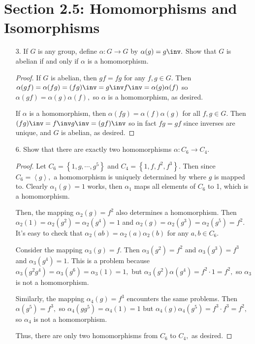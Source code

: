 \documentclass{article}
\begin{document}
\section*{Section 2.5: Homomorphisms and Isomorphisms}
\begin{itemize}
	\item[3.] If $G$ is any group, define $\alpha:G\to G$ by $\alpha(g)=g\inv.$ Show that $G$ is abelian if and only if $\alpha$ is a homomorphism.
		\begin{proof}
			If $G$ is abelian, then $gf=fg$ for any $f, g\in G.$ Then $\alpha(gf)=\alpha(fg)=(fg)\inv=g\inv f\inv = \alpha(g) \alpha(f)$ so $\alpha(gf)=\alpha(g)\alpha(f),$ so $\alpha$ is a homomorphism, as desired.

			If $\alpha$ is a homomorphism, then $\alpha(fg)=\alpha(f)\alpha(g)$ for all $f, g\in G.$ Then $(fg)\inv=f\inv g\inv = (gf)\inv$ so in fact $fg=gf$ since inverses are unique, and $G$ is abelian, as desired.
			
		\end{proof}

	\item[6.] Show that there are exactly two homomorphisms $\alpha:C_6\to C_4.$
		\begin{proof}
			Let $C_6=\left\{ 1, g, \cdots, g^5 \right\}$ and $C_4=\left\{ 1, f, f^2, f^3 \right\}.$ Then since $C_6=\left< g\right>,$ a homomorphism is uniquely determined by where $g$ is mapped to. Clearly $\alpha_1(g)=1$ works, then $\alpha_1$ maps all elements of $C_6$ to 1, which is a homomorphism. 

			Then, the mapping $\alpha_2(g)=f^2$ also determines a homomorphism. Then $\alpha_2(1)=\alpha_2(g^2)=\alpha_2(g^4)=1$ and $\alpha_2(g)=\alpha_2(g^3)=\alpha_2(g^5)=f^2.$ It's easy to check that $\alpha_2(ab)=\alpha_2(a)\alpha_2(b)$ for any $a, b\in C_6.$ 

			Consider the mapping $\alpha_3(g)=f.$ Then $\alpha_3(g^2)=f^2$ and $\alpha_3(g^3)=f^3$ and $\alpha_3(g^4)=1.$ This is a problem because $\alpha_3(g^2 g^4)=\alpha_3(g^6)=\alpha_3(1)=1,$ but $\alpha_3(g^2)\alpha(g^4)=f^2\cdot 1=f^2,$ so $\alpha_3$ is not a homomorphism.

			Similarly, the mapping $\alpha_4(g)=f^3$ encounters the same problems. Then $\alpha(g^5)=f^3,$ so $\alpha_4(gg^5)=\alpha_4(1)=1$ but $\alpha_4(g)\alpha_4(g^5)=f^3\cdot f^3=f^2,$ so $\alpha_4$ is not a homomorphism.

			Thus, there are only two homomorphisms from $C_6$ to $C_4,$ as desired.
			

\end{proof}
\end{itemize}
\end{document}
